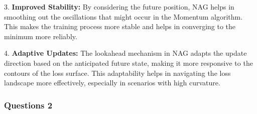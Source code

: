 \begin{qsolve}
\begin{qsolve}[]
3. \textbf{Improved Stability:} By considering the future position, NAG helps in smoothing out the oscillations that might occur in the Momentum algorithm. This makes the training process more stable and helps in converging to the minimum more reliably.

4. \textbf{Adaptive Updates:} The lookahead mechanism in NAG adapts the update direction based on the anticipated future state, making it more responsive to the contours of the loss surface. This adaptability helps in navigating the loss landscape more effectively, especially in scenarios with high curvature.

    \end{qsolve}
\end{qsolve}
\subsubsection{Questions 2}

